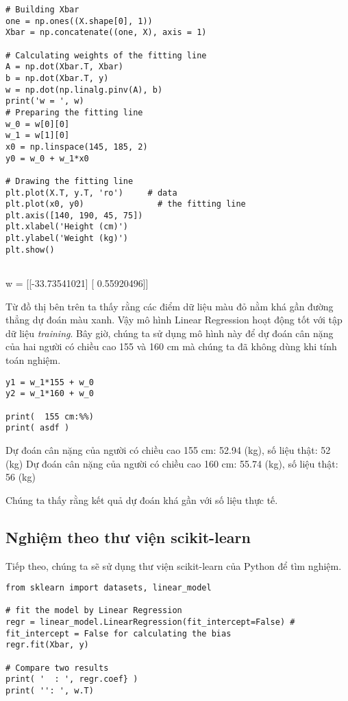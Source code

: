 \begin{lstlisting}
# Building Xbar  
one = np.ones((X.shape[0], 1)) 
Xbar = np.concatenate((one, X), axis = 1) 
 
# Calculating weights of the fitting line  
A = np.dot(Xbar.T, Xbar) 
b = np.dot(Xbar.T, y) 
w = np.dot(np.linalg.pinv(A), b) 
print('w = ', w) 
# Preparing the fitting line  
w_0 = w[0][0] 
w_1 = w[1][0] 
x0 = np.linspace(145, 185, 2) 
y0 = w_0 + w_1*x0 
 
# Drawing the fitting line  
plt.plot(X.T, y.T, 'ro')     # data  
plt.plot(x0, y0)               # the fitting line 
plt.axis([140, 190, 45, 75]) 
plt.xlabel('Height (cm)') 
plt.ylabel('Weight (kg)') 
plt.show() 
 
\end{lstlisting}
 
w =  [[-33.73541021] 
 [  0.55920496]] 
 
 
 
Từ đồ thị bên trên ta thấy rằng các điểm dữ liệu màu đỏ nằm khá gần đường thẳng dự đoán màu xanh. Vậy mô hình Linear Regression hoạt động tốt với tập dữ liệu \textit{training}. Bây giờ, chúng ta sử dụng mô hình này để dự đoán cân nặng của hai người có chiều cao 155 và 160 cm mà chúng ta đã không dùng khi tính toán nghiệm. 
 
 
\begin{lstlisting}
y1 = w_1*155 + w_0 
y2 = w_1*160 + w_0 
 
print(  155 cm:%%)
print( asdf ) 
\end{lstlisting}
 
    Dự đoán cân nặng của người có chiều cao 155 cm: 52.94 (kg), số liệu thật: 52 (kg) 
    Dự đoán cân nặng của người có chiều cao 160 cm: 55.74 (kg), số liệu thật: 56 (kg) 
 
 
 
Chúng ta thấy rằng kết quả dự đoán khá gần với số liệu thực tế. 
 
 
\subsection{Nghiệm theo thư viện scikit-learn}
 
Tiếp theo, chúng ta sẽ sử dụng thư viện scikit-learn của Python để tìm nghiệm.  
 
 
\begin{lstlisting}
from sklearn import datasets, linear_model 
 
# fit the model by Linear Regression 
regr = linear_model.LinearRegression(fit_intercept=False) # fit_intercept = False for calculating the bias 
regr.fit(Xbar, y) 
 
# Compare two results 
print( '  : ', regr.coef} ) 
print( '': ', w.T) 
\end{lstlisting}
 
